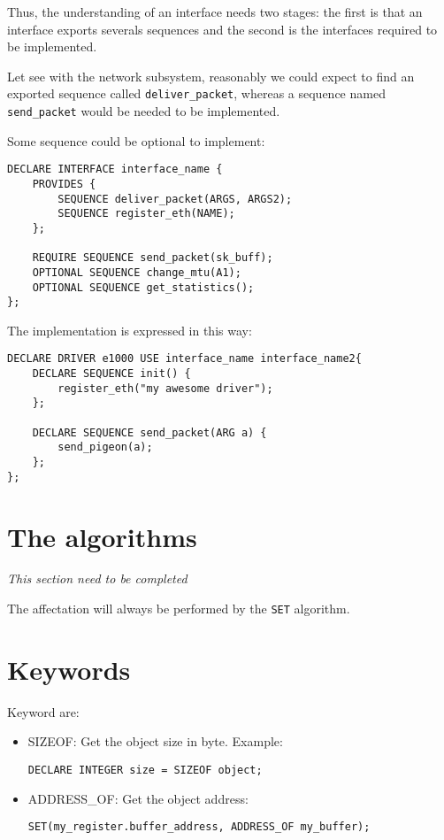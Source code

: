 \documentclass[american]{rtxreport}
\begin{document}
Thus, the understanding of an interface needs two stages: the first is that an interface exports
severals sequences and the second is the interfaces required to be implemented.

Let see with the network subsystem, reasonably we could expect to find an exported sequence called
\texttt{deliver\_packet}, whereas a sequence named \texttt{send\_packet} would be needed to be implemented.

Some sequence could be optional to implement:

\begin{lstlisting}[caption=Exemple de declaration d'une interface]
DECLARE INTERFACE interface_name {
	PROVIDES {
		SEQUENCE deliver_packet(ARGS, ARGS2);
		SEQUENCE register_eth(NAME);
	};

	REQUIRE SEQUENCE send_packet(sk_buff);
	OPTIONAL SEQUENCE change_mtu(A1);
	OPTIONAL SEQUENCE get_statistics();
};
\end{lstlisting}

The implementation is expressed in this way:

\begin{lstlisting}[caption=Utilisation d'une interface]
DECLARE DRIVER e1000 USE interface_name interface_name2{
	DECLARE SEQUENCE init() {
		register_eth("my awesome driver");
	};

	DECLARE SEQUENCE send_packet(ARG a) {
		send_pigeon(a);
	};
};
\end{lstlisting}


\section{The algorithms}
\emph{This section need to be completed}

The affectation will always be performed by the \texttt{SET} algorithm.

\section{Keywords}

Keyword are:
\begin{itemize}
	\item SIZEOF: Get the object size in byte. Example:
	\begin{lstlisting}[caption=Sizeof example]
		DECLARE INTEGER size = SIZEOF object;
	\end{lstlisting}

	\item ADDRESS\_OF: Get the object address:
	\begin{lstlisting}[caption=Sizeof example]
		SET(my_register.buffer_address, ADDRESS_OF my_buffer);
	\end{lstlisting}
\end{itemize}
\end{document}
